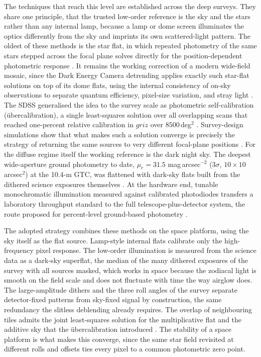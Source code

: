\documentclass[10pt,onecolumn]{article}
\begin{document}
The techniques that reach this level are established across the deep surveys. They share one principle, that the trusted low-order reference is the sky and the stars rather than any internal lamp, because a lamp or dome screen illuminates the optics differently from the sky and imprints its own scattered-light pattern. The oldest of these methods is the star flat, in which repeated photometry of the same stars stepped across the focal plane solves directly for the position-dependent photometric response \cite{manfroid1996}. It remains the working correction of a modern wide-field mosaic, since the Dark Energy Camera detrending applies exactly such star-flat solutions on top of its dome flats, using the internal consistency of on-sky observations to separate quantum efficiency, pixel-size variation, and stray light \cite{bernstein2017pasp}. The SDSS generalised the idea to the survey scale as photometric self-calibration (\"ubercalibration), a single least-squares solution over all overlapping scans that reached one-percent relative calibration in $griz$ over $8500$\,deg$^2$ \cite{padmanabhan2008}. Survey-design simulations show that what makes such a solution converge is precisely the strategy of returning the same sources to very different focal-plane positions \cite{holmes2012}. For the diffuse regime itself the working reference is the dark night sky. The deepest wide-aperture ground photometry to date, $\mu_r=31.5$ mag\,arcsec$^{-2}$ ($3\sigma$, $10\times10$\,arcsec$^2$) at the 10.4-m GTC, was flattened with dark-sky flats built from the dithered science exposures themselves \cite{trujillofliri2016}. At the hardware end, tunable monochromatic illumination measured against calibrated photodiodes transfers a laboratory throughput standard to the full telescope-plus-detector system, the route proposed for percent-level ground-based photometry \cite{stubbs2006}.

The adopted strategy combines these methods on the space platform, using the sky itself as the flat source. Lamp-style internal flats calibrate only the high-frequency pixel response. The low-order illumination is measured from the science data as a dark-sky superflat, the median of the many dithered exposures of the survey with all sources masked, which works in space because the zodiacal light is smooth on the field scale and does not fluctuate with time the way airglow does. The large-amplitude dithers and the three roll angles of the survey separate detector-fixed patterns from sky-fixed signal by construction, the same redundancy the slitless deblending already requires. The overlap of neighbouring tiles admits the joint least-squares solution for the multiplicative flat and the additive sky that the \"ubercalibration introduced \cite{padmanabhan2008}. The stability of a space platform is what makes this converge, since the same star field revisited at different rolls and offsets ties every pixel to a common photometric zero point.
\end{document}

